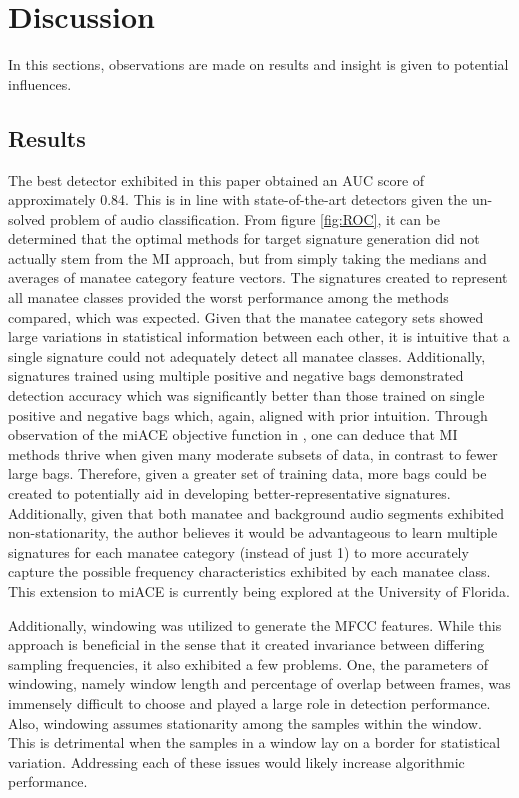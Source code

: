 \documentclass[conference]{IEEEtran}
\begin{document}

\section{Discussion} \label{Discussion}
In this sections, observations are made on results and insight is given to potential influences.

\subsection{Results}
The best detector exhibited in this paper obtained an AUC score of approximately 0.84.  This is in line with state-of-the-art detectors given the un-solved problem of audio classification.  From figure \ref{fig:ROC}, it can be determined that the optimal methods for target signature generation did not actually stem from the MI approach, but from simply taking the medians and averages of manatee category feature vectors.  The signatures created to represent all manatee classes provided the worst performance among the methods compared, which was expected.  Given that the manatee category sets showed large variations in statistical information between each other, it is intuitive that a single signature could not adequately detect all manatee classes.  Additionally, signatures trained using multiple positive and negative bags demonstrated detection accuracy which was significantly better than those trained on single positive and negative bags which, again, aligned with prior intuition.  Through observation of the miACE objective function in \cite{miACE}, one can deduce that MI methods thrive when given many moderate subsets of data, in contrast to fewer large bags.  Therefore, given a greater set of training data, more bags could be created to potentially aid in developing better-representative signatures.  Additionally, given that both manatee and background audio segments exhibited non-stationarity, the author believes it would be advantageous to learn multiple signatures for each manatee category (instead of just 1) to more accurately capture the possible frequency characteristics exhibited by each manatee class. This extension to miACE is currently being explored at the University of Florida. 

Additionally, windowing was utilized to generate the MFCC features.  While this approach is beneficial in the sense that it created invariance between differing sampling frequencies, it also exhibited a few problems.  One, the parameters of windowing, namely window length and percentage of overlap between frames, was immensely difficult to choose and played a large role in detection performance.  Also, windowing assumes stationarity among the samples within the window.  This is detrimental when the samples in a window lay on a border for statistical variation.  Addressing each of these issues would likely increase algorithmic performance.
\end{document}
